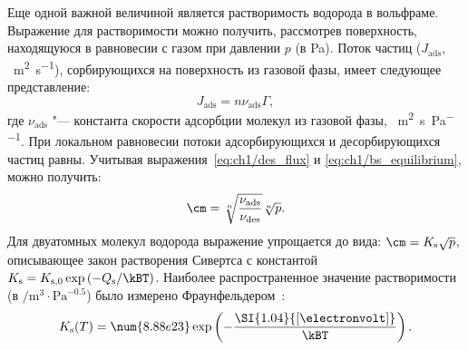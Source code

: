 Еще одной важной величиной является растворимость водорода в вольфраме. Выражение для растворимости можно получить, рассмотрев поверхность, находящуюся в равновесии с газом при давлении \( p \) (в \si{\pascal}). Поток частиц (\( J_\mathrm{ads} \), \si{\per\meter\squared\per\second}), сорбирующихся на поверхность из газовой фазы, имеет следующее представление: 
\begin{equation}
    J_\mathrm{ads} = n \nu_{\mathrm{ads}} \Gamma,
\end{equation}
где \( \nu_{\mathrm{ads}} \) "--- константа скорости адсорбции молекул из газовой фазы, \si{\per\meter\squared\per\second\per\pascal}. При локальном равновесии потоки адсорбирующихся и десорбирующихся частиц равны. Учитывая выражения~\eqref{eq:ch1/des_flux} и \eqref{eq:ch1/bs_equilibrium}, можно получить:
\begin{equation}
    \cm = \sqrt[n]{\frac{\nu_\mathrm{ads}}{\nu_\mathrm{des}}}\sqrt[n]{p}.
\end{equation}
Для двуатомных молекул водорода выражение упрощается до вида: \( \cm = K_\mathrm{s} \sqrt{p} \), описывающее закон растворения Сивертса с константой \( K_\mathrm{s}=K_{\mathrm{s},0} \exp \left( -Q_\mathrm{s}/\kBT \right) \). Наиболее распространенное значение растворимости (в \( \si{\per\meter\cubed}\cdot\si{\pascal}^{-0.5} \)) было измерено Фраунфельдером~\cite{frauenfelder1969solution}:
\begin{equation}
    K_\mathrm{s}(T) = \num{8.88e23} \exp \left( -\frac{\SI{1.04}{[\electronvolt]}}{\kBT} \right).
\end{equation}


